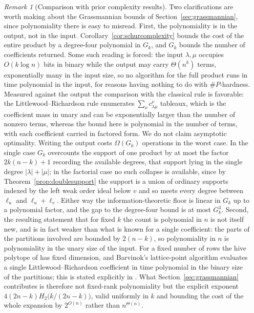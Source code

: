 \documentclass{amsart}
\theoremstyle{definition}
\theoremstyle{remark}
\newtheorem{remark}[lemma]{Remark}
\numberwithin{equation}{section}
\begin{document}
\begin{remark}[Comparison with prior complexity results]
Two clarifications are worth making about the Grassmannian bounds of Section~\ref{sec:grassmannian}, since polynomiality there is easy to misread. First, the polynomiality is in the output, not in the input. Corollary~\ref{cor:schurcomplexity} bounds the cost of the entire product by a degree-four polynomial in $G_k$, and $G_k$ bounds the number of coefficients returned. Some such reading is forced: the input $\lambda,\mu$ occupies $O(k\log n)$ bits in binary while the output may carry $\Theta(n^k)$ terms, exponentially many in the input size, so no algorithm for the full product runs in time polynomial in the input, for reasons having nothing to do with $\#P$-hardness. Measured against the output the comparison with the classical rule is favorable: the Littlewood--Richardson rule enumerates $\sum_\nu c_{\lambda\mu}^\nu$ tableaux, which is the coefficient mass in unary and can be exponentially larger than the number of nonzero terms, whereas the bound here is polynomial in the number of terms, with each coefficient carried in factored form. We do not claim asymptotic optimality. Writing the output costs $\Omega(G_k)$ operations in the worst case. In the single case $G_k$ overcounts the support of one product by at most the factor $2k(n-k)+1$ recording the available degrees, that support lying in the single degree $|\lambda|+|\mu|$; in the factorial case no such collapse is available, since by Theorem~\ref{prop:doublesupport} the support is a union of ordinary supports indexed by the left weak order ideal below $v$ and so meets every degree between $\ell_u$ and $\ell_u+\ell_v$. Either way the information-theoretic floor is linear in $G_k$ up to a polynomial factor, and the gap to the degree-four bound is at most $G_k^{3}$. Second, the resulting statement that for fixed $k$ the count is polynomial in $n$ is not itself new, and is in fact weaker than what is known for a single coefficient: the parts of the partitions involved are bounded by $2(n-k)$, so polynomiality in $n$ is polynomiality in the unary size of the input. For a fixed number of rows the hive polytope of \cite{knutson1999honeycomb} has fixed dimension, and Barvinok's lattice-point algorithm \cite{barvinok2003short} evaluates a single Littlewood--Richardson coefficient in time polynomial in the binary size of the partitions; this is stated explicitly in \cite{deloera2006clebsch}. What Section~\ref{sec:grassmannian} contributes is therefore not fixed-rank polynomiality but the explicit exponent $4(2n-k)H_2\!\big(k/(2n-k)\big)$, valid uniformly in $k$ and bounding the cost of the whole expansion by $2^{O(n)}$ rather than $n^{\Theta(n)}$.
\end{remark}
\end{document}
